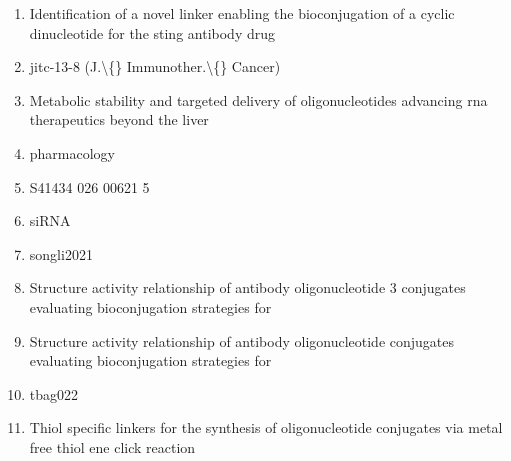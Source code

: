 \documentclass[10pt]{article}
\begin{document}
\begin{enumerate}
\item Identification of a novel linker enabling the bioconjugation of a cyclic dinucleotide for the sting antibody drug
\item jitc-13-8 (J.\textbackslash\{\} Immunother.\textbackslash\{\} Cancer)
\item Metabolic stability and targeted delivery of oligonucleotides advancing rna therapeutics beyond the liver
\item pharmacology
\item S41434 026 00621 5
\item siRNA
\item songli2021
\item Structure activity relationship of antibody oligonucleotide 3 conjugates evaluating bioconjugation strategies for
\item Structure activity relationship of antibody oligonucleotide conjugates evaluating bioconjugation strategies for
\item tbag022
\item Thiol specific linkers for the synthesis of oligonucleotide conjugates via metal free thiol ene click reaction
\end{enumerate}
\end{document}

